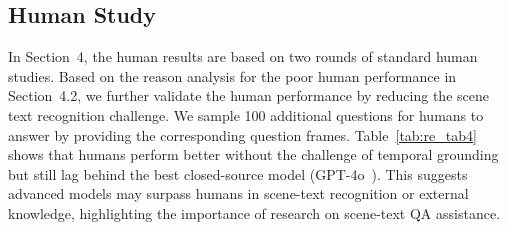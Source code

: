 \subsection{Human Study}
\label{sup:human}
In Section~{\color{red}4}, the human results %
are based on two rounds of standard human studies. Based on the reason analysis for the poor human performance in Section~{\color{red}4.2},
we further validate the human performance by reducing the scene text recognition challenge. We sample 100 additional questions for humans to answer by providing the corresponding question frames. 
Table~\ref{tab:re_tab4} shows that humans perform better without the challenge of temporal grounding but still lag behind the best closed-source model (GPT-4o~\cite{achiam2023gpt}). This suggests advanced models may surpass humans in scene-text recognition or external knowledge, highlighting the importance of research on scene-text QA assistance.


\begin{table}
\caption{Effects of combining different heuristic strategies. T: Timestamp-Aware Sampling. ST: Additional Scene Text Input. HR: High-Resolution Scene Text (Scale = 1.25$\times$). We experiment with 30\% of the data for efficiency.}
\label{tab:supp_tab2}
\setlength{\tabcolsep}{.1em}
\centering
\fontsize{13}{15}\selectfont
{}
\end{table}

